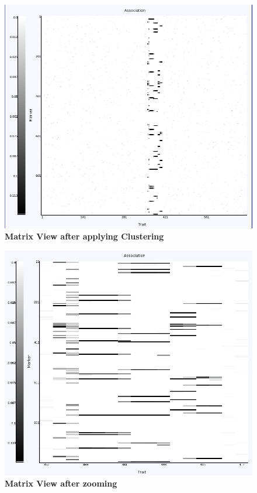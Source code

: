 \documentclass{article}
\begin{document}
\begin{figure}
\includegraphics[width=\textwidth]{matrixViewClustered.png}
\caption{\textbf{Matrix View after applying Clustering}}
\label{matrixViewClustered}
\end{figure}

\begin{figure}
\includegraphics[width=\textwidth]{matrixViewZoomed.png}
\caption{\textbf{Matrix View after zooming}}
\label{matrixViewZoomed}
\end{figure}
\end{document}
